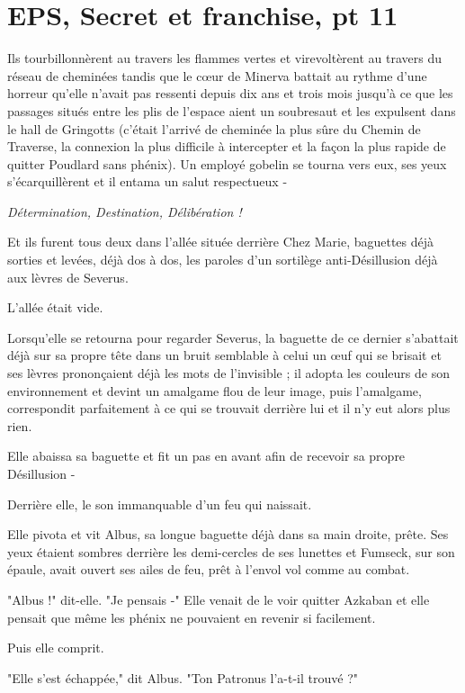 
\chapter{EPS, Secret et franchise, pt 11}

Ils tourbillonnèrent au travers les flammes vertes et virevoltèrent au travers du réseau de cheminées tandis que le cœur de Minerva battait au rythme d'une horreur qu'elle n'avait pas ressenti depuis dix ans et trois mois jusqu'à ce que les passages situés entre les plis de l'espace aient un soubresaut et les expulsent dans le hall de Gringotts (c'était l'arrivé de cheminée la plus sûre du Chemin de Traverse, la connexion la plus difficile à intercepter et la façon la plus rapide de quitter Poudlard sans phénix). Un employé gobelin se tourna vers eux, ses yeux s'écarquillèrent et il entama un salut respectueux -

\emph{Détermination, Destination, Délibération !} 

Et ils furent tous deux dans l'allée située derrière Chez Marie, baguettes déjà sorties et levées, déjà dos à dos, les paroles d'un sortilège anti-Désillusion déjà aux lèvres de Severus.

L'allée était vide.

Lorsqu'elle se retourna pour regarder Severus, la baguette de ce dernier s'abattait déjà sur sa propre tête dans un bruit semblable à celui un œuf qui se brisait et ses lèvres prononçaient déjà les mots de l'invisible ; il adopta les couleurs de son environnement et devint un amalgame flou de leur image, puis l'amalgame, correspondit parfaitement à ce qui se trouvait derrière lui et il n'y eut alors plus rien.

Elle abaissa sa baguette et fit un pas en avant afin de recevoir sa propre Désillusion -

Derrière elle, le son immanquable d'un feu qui naissait.

Elle pivota et vit Albus, sa longue baguette déjà dans sa main droite, prête. Ses yeux étaient sombres derrière les demi-cercles de ses lunettes et Fumseck, sur son épaule, avait ouvert ses ailes de feu, prêt à l'envol vol comme au combat.

"Albus !" dit-elle. "Je pensais -" Elle venait de le voir quitter Azkaban et elle pensait que même les phénix ne pouvaient en revenir si facilement.

Puis elle comprit.

"Elle s'est échappée," dit Albus. "Ton Patronus l'a-t-il trouvé ?"


